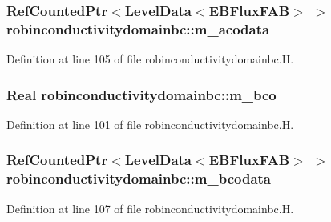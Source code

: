 \subsubsection[{\texorpdfstring{m\+\_\+acodata}{m_acodata}}]{\setlength{\rightskip}{0pt plus 5cm}Ref\+Counted\+Ptr$<$Level\+Data$<$E\+B\+Flux\+F\+AB$>$ $>$ robinconductivitydomainbc\+::m\+\_\+acodata\hspace{0.3cm}{\ttfamily [protected]}}\hypertarget{classrobinconductivitydomainbc_abcba1dd6b3ac37f9c0f32f5b460582db}{}\label{classrobinconductivitydomainbc_abcba1dd6b3ac37f9c0f32f5b460582db}


Definition at line 105 of file robinconductivitydomainbc.\+H.

\subsubsection[{\texorpdfstring{m\+\_\+bco}{m_bco}}]{\setlength{\rightskip}{0pt plus 5cm}Real robinconductivitydomainbc\+::m\+\_\+bco\hspace{0.3cm}{\ttfamily [protected]}}\hypertarget{classrobinconductivitydomainbc_af3d3ea2beabe95a46bef1f3cb2717eb6}{}\label{classrobinconductivitydomainbc_af3d3ea2beabe95a46bef1f3cb2717eb6}


Definition at line 101 of file robinconductivitydomainbc.\+H.

\subsubsection[{\texorpdfstring{m\+\_\+bcodata}{m_bcodata}}]{\setlength{\rightskip}{0pt plus 5cm}Ref\+Counted\+Ptr$<$Level\+Data$<$E\+B\+Flux\+F\+AB$>$ $>$ robinconductivitydomainbc\+::m\+\_\+bcodata\hspace{0.3cm}{\ttfamily [protected]}}\hypertarget{classrobinconductivitydomainbc_a05ecbe71c79dd2e7c53f4a7983cd071a}{}\label{classrobinconductivitydomainbc_a05ecbe71c79dd2e7c53f4a7983cd071a}


Definition at line 107 of file robinconductivitydomainbc.\+H.

